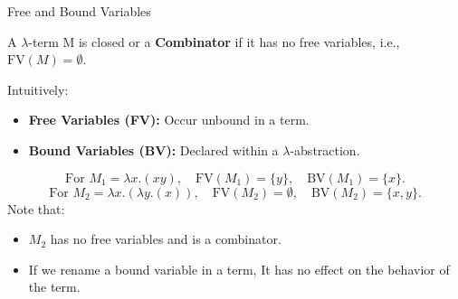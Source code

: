 \documentclass{beamer}
\begin{document}
\begin{frame}{Free and Bound Variables}

  \begin{definition}
    A $\lambda$-term M is closed or a \textbf{Combinator} if it has no free variables, i.e., $\text{FV}(M) = \emptyset$.
  \end{definition}

  Intuitively:
  \begin{itemize}
    \item \textbf{Free Variables (FV):} Occur unbound in a term.
    \item \textbf{Bound Variables (BV):} Declared within a $\lambda$-abstraction.
  \end{itemize}
  \vspace{1em}
  \[
  \text{For } M_1 = \lambda x. (xy), \quad \text{FV}(M_1)=\{y\},\quad \text{BV}(M_1)=\{x\}.
  \]
  \[
  \text{For } M_2 = \lambda x.(\lambda y. (x)), \quad \text{FV}(M_2)=\emptyset,\quad \text{BV}(M_2)=\{x,y\}.
  \]
  Note that:
  \begin{itemize}
    \item \(M_2\) has no free variables and is a combinator.
    \item If we rename a bound variable in a term, It has no effect on the behavior of the term.
  \end{itemize}
\end{frame}



\end{document}
